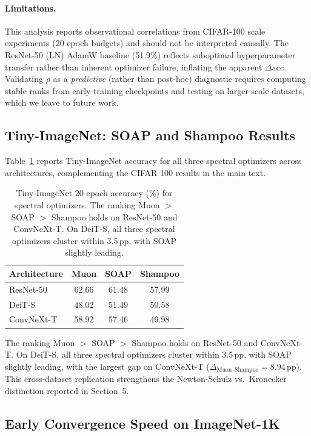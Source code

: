 \paragraph{Limitations.}
This analysis reports observational correlations from CIFAR-100 scale
experiments (20 epoch budgets) and should not be interpreted causally.
The ResNet-50 (LN) AdamW baseline (51.9\%) reflects suboptimal hyperparameter
transfer rather than inherent optimizer failure, inflating the apparent
$\Delta\mathrm{acc}$.
Validating $\rho$ as a \emph{predictive} (rather than post-hoc) diagnostic
requires computing stable ranks from early-training checkpoints and testing
on larger-scale datasets, which we leave to future work.

\subsection{Tiny-ImageNet: SOAP and Shampoo Results}
\label{sec:tinyin_soap_shampoo}

Table~\ref{tab:tinyin_spectral} reports Tiny-ImageNet accuracy for all three spectral optimizers across architectures, complementing the CIFAR-100 results in the main text.

\begin{table}[h]
\centering
\caption{Tiny-ImageNet 20-epoch accuracy (\%) for spectral optimizers. The ranking Muon $>$ SOAP $>$ Shampoo holds on ResNet-50 and ConvNeXt-T. On DeiT-S, all three spectral optimizers cluster within 3.5\,pp, with SOAP slightly leading.}
\label{tab:tinyin_spectral}
\small
\begin{tabular}{lccc}
\toprule
Architecture & Muon & SOAP & Shampoo \\
\midrule
ResNet-50 & 62.66 & 61.48 & 57.99 \\
DeiT-S & 48.02 & 51.49 & 50.58 \\
ConvNeXt-T & 58.92 & 57.46 & 49.98 \\
\bottomrule
\end{tabular}
\end{table}

The ranking Muon $>$ SOAP $>$ Shampoo holds on ResNet-50 and ConvNeXt-T. On DeiT-S, all three spectral optimizers cluster within 3.5\,pp, with SOAP slightly leading, with the largest gap on ConvNeXt-T ($\Delta_{\text{Muon--Shampoo}} = 8.94$\,pp). This cross-dataset replication strengthens the Newton-Schulz vs.\ Kronecker distinction reported in Section~5.

\subsection{Early Convergence Speed on ImageNet-1K}
\label{sec:imagenet1k_convergence}

